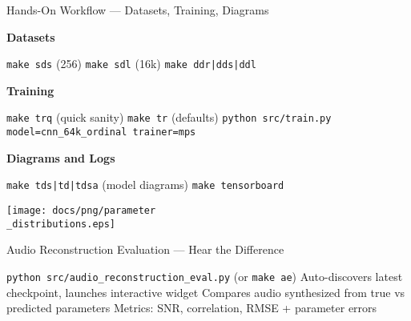 \begin{slide}[\slideopts,toc={Workflow}]{Hands-On Workflow --- Datasets, Training, Diagrams}
  \vspace{-0.75em}
  \begin{itemize}
    \mpitem \textbf{Datasets}
    \vspace{-0.25em}
    \begin{itemize}
      \mpitem \texttt{make sds} (256) \quad \texttt{make sdl} (16k) \quad \texttt{make ddr|dds|ddl}
    \end{itemize}
    \mpitem \textbf{Training}
    \vspace{-0.25em}
    \begin{itemize}
      \mpitem \texttt{make trq} (quick sanity) \quad \texttt{make tr} (defaults)
      \mpitem \texttt{python src/train.py model=cnn\_64k\_ordinal trainer=mps}
    \end{itemize}
    \mpitem \textbf{Diagrams and Logs}
    \vspace{-0.25em}
    \begin{itemize}
      \mpitem \texttt{make tds|td|tdsa} (model diagrams) \quad \texttt{make tensorboard}
    \end{itemize}
  \end{itemize}
  \vspace{0.25em}
  \begin{center}
    \texttt{[image: docs/png/parameter\\\_distributions.eps]}
  \end{center}
\end{slide}

\begin{slide}[\slideopts,toc={Audio Eval}]{Audio Reconstruction Evaluation --- Hear the Difference}
  \vspace{-0.75em}
  \begin{itemize}
    \mpitem \texttt{python src/audio\_reconstruction\_eval.py} (or \texttt{make ae})
    \mpitem Auto-discovers latest checkpoint, launches interactive widget
    \mpitem Compares audio synthesized from true vs predicted parameters
    \mpitem Metrics: SNR, correlation, RMSE + parameter errors
  \end{itemize}
  \vspace{0.25em}
  \begin{center}
    \setlength{\fboxsep}{6pt}
  \end{center}
\end{slide}


